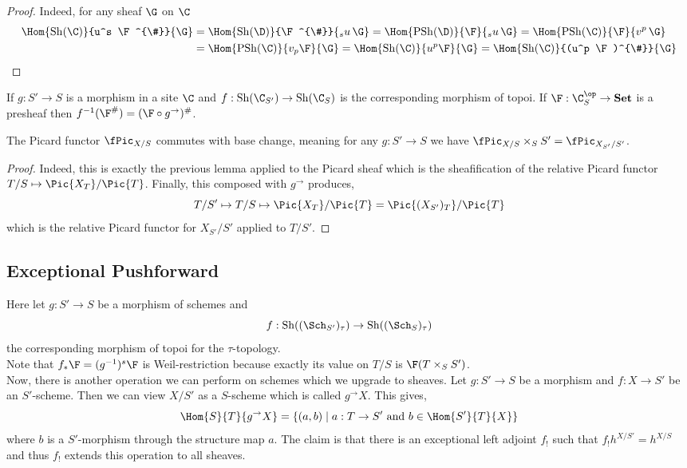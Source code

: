 \documentclass[12pt]{article}
\begin{document}
\begin{proof}
Indeed, for any sheaf $\G$ on $\C$
\begin{align*}
\Hom{\Sh(\C)}{u^s \F^{\#}}{\G} &= \Hom{\Sh(\D)}{\F^{\#}}{{}_s u \, \G} = \Hom{\PSh(\D)}{\F}{{}_s u \, \G} = \Hom{\PSh(\C)}{\F}{v^p \, \G}
\\
& = \Hom{\PSh(\C)}{v_p \F}{\G} = \Hom{\Sh(\C)}{u^p \F}{\G} = \Hom{\Sh(\C)}{(u^p \F)^{\#}}{\G} 
\end{align*}
\end{proof}

\begin{cor}
If $g : S' \to S$ is a morphism in a site $\C$ and $f : \Sh(\C_{S'}) \to \Sh(\C_{S})$ is the corresponding morphism of topoi. If $\F : \C_{S}^\op \to \Set$ is a presheaf then $f^{-1} (\F^{\#}) = (\F \circ g^{\to})^{\#}$. 
\end{cor}

\begin{cor}
The Picard functor $\fPic_{X/S}$ commutes with base change, meaning for any $g : S' \to S$ we have $\fPic_{X/S} \times_S S' = \fPic_{X_{S'}/S'}$.
\end{cor}

\begin{proof}
Indeed, this is exactly the previous lemma applied to the Picard sheaf which is the sheafification of the relative Picard functor $T/S \mapsto \Pic{X_T}/\Pic{T}$. Finally, this composed with $g^{\to}$ produces,
\[ T/S' \mapsto T/S \mapsto \Pic{X_T} / \Pic{T} = \Pic{(X_{S'})_T} / \Pic{T} \]
which is the relative Picard functor for $X_{S'}/S'$ applied to $T/S'$.
\end{proof}


\subsection{Exceptional Pushforward}

Here let $g : S' \to S$ be a morphism of schemes and 
\[ f : \Sh((\Sch_{S'})_{\tau}) \to \Sh((\Sch_{S})_{\tau}) \]
the corresponding morphism of topoi for the $\tau$-topology. 
\bigskip\\
Note that $f_* \F = (g^{-1})^s \F$ is Weil-restriction because exactly its value on $T/S$ is $\F(T \times_S S')$.
\bigskip\\
Now, there is another operation we can perform on schemes which we upgrade to sheaves. Let $g : S' \to S$ be a morphism and $f : X \to S'$ be an $S'$-scheme. Then we can view $X/S'$ as a $S$-scheme which is called $g^{\to} X$. This gives,
\[ \Hom{S}{T}{g^{\to} X} = \{ (a,b) \mid a : T \to S' \text{ and } b \in \Hom{S'}{T}{X} \} \]
where $b$ is a $S'$-morphism through the structure map $a$. The claim is that there is an exceptional left adjoint $f_!$ such that $f_! h^{X/S'} = h^{X/S}$ and thus $f_!$ extends this operation to all sheaves.
\end{document}
